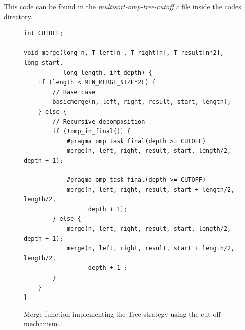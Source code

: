 \documentclass[12pt, a4paper]{article}
\begin{document}
This code can be found in the \textit{multisort-omp-tree-cutoff.c} file inside the codes directory.

\begin{figure}[H]
\begin{lstlisting}
int CUTOFF;

void merge(long n, T left[n], T right[n], T result[n*2], long start,
		   long length, int depth) {
    if (length < MIN_MERGE_SIZE*2L) {
        // Base case
        basicmerge(n, left, right, result, start, length);
    } else {
        // Recursive decomposition
        if (!omp_in_final()) {
			#pragma omp task final(depth >= CUTOFF)
			merge(n, left, right, result, start, length/2, depth + 1);
			
			#pragma omp task final(depth >= CUTOFF)
			merge(n, left, right, result, start + length/2, length/2,
				  depth + 1);
		} else {
			merge(n, left, right, result, start, length/2, depth + 1);
			merge(n, left, right, result, start + length/2, length/2,
				  depth + 1);
		}
    }
}
\end{lstlisting}

\caption{Merge function implementing the Tree strategy using the cut-off mechanism.}
\end{figure}
\end{document}
